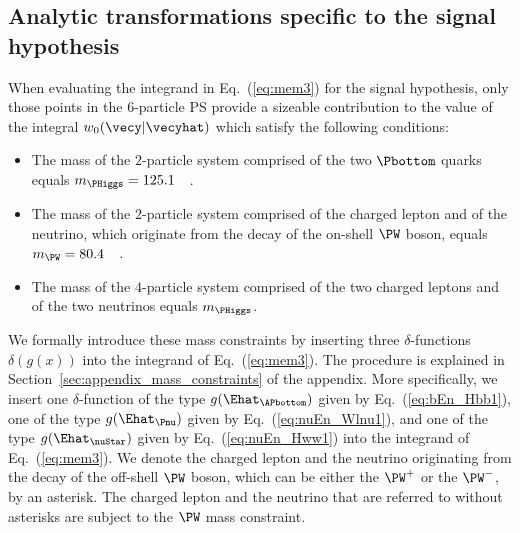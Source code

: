 \subsection{Analytic transformations specific to the signal hypothesis}
\label{sec:mem_signal}

When evaluating the integrand in Eq.~(\ref{eq:mem3}) for the signal hypothesis,
only those points in the $6$-particle PS provide a sizeable contribution to the value of the integral $w_{0}(\vecy|\vecyhat)$
which satisfy the following conditions:
\begin{itemize}
\item The mass of the $2$-particle system comprised of the two $\Pbottom$ quarks equals $m_{\PHiggs} = 125.1$~\GeV~\cite{HIG-14-042}.
\item The mass of the $2$-particle system comprised of the charged lepton and of the neutrino, which originate from the decay of the on-shell $\PW$ boson, equals $m_{\PW} = 80.4$~\GeV~\cite{PDG}.
\item The mass of the $4$-particle system comprised of the two charged leptons and of the two neutrinos equals $m_{\PHiggs}$.
\end{itemize}

We formally introduce these mass constraints by inserting three $\delta$-functions $\delta\left( g(x) \right)$ into the integrand of Eq.~(\ref{eq:mem3}).
The procedure is explained in Section~\ref{sec:appendix_mass_constraints} of the appendix.
More specifically, we insert
one $\delta$-function of the type $g(\Ehat_{\APbottom})$ given by Eq.~(\ref{eq:bEn_Hbb1}), 
one of the type $g(\Ehat_{\Pnu})$ given by Eq.~(\ref{eq:nuEn_Wlnu1}), and one of the type $g(\Ehat_{\nuStar})$ given by Eq.~(\ref{eq:nuEn_Hww1}) into the integrand of Eq.~(\ref{eq:mem3}).
We denote the charged lepton and the neutrino originating from the decay of the off-shell $\PW$ boson, which can be either the $\PW^{+}$ or the $\PW^{-}$, by an asterisk.
The charged lepton and the neutrino that are referred to without asterisks are subject to the $\PW$ mass constraint.

